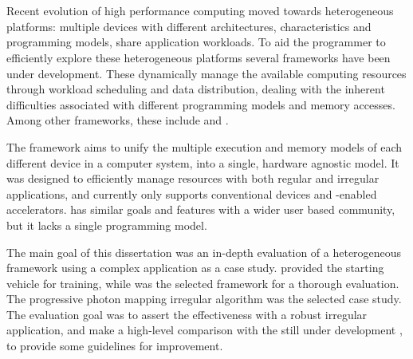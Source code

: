 \documentclass[main.tex]{subfiles}
\begin{document}
\cleardoublepage
{}
{}
\chapter*{\abstractname}

Recent evolution of high performance computing moved towards heterogeneous platforms: multiple devices with different architectures, characteristics and programming models, share application workloads. To aid the programmer to efficiently explore these heterogeneous platforms several frameworks have been under development. These dynamically manage the available computing resources through workload scheduling and data distribution, dealing with the inherent difficulties associated with different programming models and memory accesses. Among other frameworks, these include \gama and \starpu.

The \gama framework aims to unify the multiple execution and memory models of each different device in a computer system, into a single, hardware agnostic model. It was designed to efficiently manage resources with both regular and irregular applications, and currently only supports conventional \cpu devices and \cuda-enabled accelerators. \starpu has similar goals and features with a wider user based community, but it lacks a single programming model.

The main goal of this dissertation was an in-depth evaluation of a heterogeneous framework using a complex application as a case study. \gama provided the starting vehicle for training, while \starpu was the selected framework for a thorough evaluation. The progressive photon mapping irregular algorithm was the selected case study. The evaluation goal was to assert the \starpu effectiveness with a robust irregular application, and make a high-level comparison with the still under development \gama, to provide some guidelines for \gama improvement.
\end{document}
